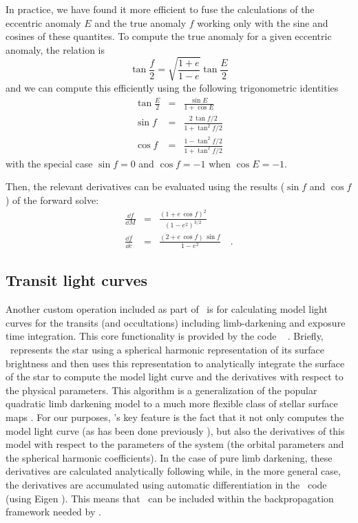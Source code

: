 \documentclass[modern]{aastex62}
\begin{document}
In practice, we have found it more efficient to fuse the calculations of the eccentric anomaly $E$ and the true anomaly $f$ working only with the sine and cosines of these quantites.
To compute the true anomaly for a given eccentric anomaly, the relation is
\begin{equation}
\tan\frac{f}{2} = \sqrt{\frac{1 + e}{1-e}}\tan\frac{E}{2}
\end{equation}
and we can compute this efficiently using the following trigonometric identities
\begin{eqnarray}
\tan \frac{E}{2} &=& \frac{\sin E}{1 + \cos E} \\
\sin f &=& \frac{2\,\tan f/2}{1 + \tan^2 f/2} \\
\cos f &=& \frac{1 - \tan^2 f/2}{1 + \tan^2 f/2}
\end{eqnarray}
with the special case $\sin f = 0$ and $\cos f = -1$ when $\cos E = -1$.

Then, the relevant derivatives can be evaluated using the results ($\sin f$ and $\cos f$) of the forward solve:
\begin{eqnarray}
\frac{\dd f}{\dd M} &=&  \frac{\left(1 + e\,\cos f\right)^2}{\left(1-e^2\right)^{3/2}} \\
\frac{\dd f}{\dd e} &=& \frac{\left(2 + e\,\cos f\right)\,\sin f}{1 - e^2} \quad.
\end{eqnarray}

\subsection{Transit light curves}

Another custom operation included as part of \exoplanet\ is for calculating model light curves for the transits (and occultations) including limb-darkening and exposure time integration.
This core functionality is provided by the code \starry\ \citep{Luger:2019} .
Briefly, \starry\ represents the star using a spherical harmonic representation of its surface brightness and then uses this representation to analytically integrate the surface of the star to compute the model light curve and the derivatives with respect to the physical parameters.
This algorithm is a generalization of the popular quadratic limb darkening model \citep{Mandel:2002} to a much more flexible class of stellar surface maps .
For our purposes, \starry's key feature is the fact that it not only computes the model light curve (as has been done previously ), but also the derivatives of this model with respect to the parameters of the system (the orbital parameters and the spherical harmonic coefficients).
In the case of pure limb darkening, these derivatives are calculated analytically following  while, in the more general case, the derivatives are accumulated using automatic differentiation in the \cpp\ code (using Eigen ).
This means that \starry\ can be included within the backpropagation framework needed by \exoplanet.
\end{document}
